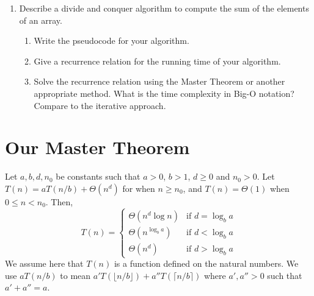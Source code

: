 \documentclass{article}
\begin{document}
\begin{enumerate}
    \item  Describe a divide and conquer algorithm to compute the sum of the elements of an array.
    \begin{enumerate}
        \item Write the pseudocode for your algorithm.
        \item Give a recurrence relation for the running time of your algorithm.
        \item Solve the recurrence relation using the Master Theorem or another appropriate method. What is the time complexity in Big-O notation?  Compare to the iterative approach.
    \end{enumerate}
\end{enumerate}

\section*{Our Master Theorem}

\begin{theorem}
Let $a, b, d, n_0$ be constants such that $a > 0$, $b > 1$, $d \ge 0$ and $n_0 > 0$. Let $T(n) = aT(n/b) + \Theta(n^d)$ for when $n \ge n_0$, and $T(n) = \Theta(1)$ when $0 \le n < n_0$. Then,
\[
T(n) = \begin{cases}
    \Theta(n^d \log n) & \text{if } d = \log_b a \\
    \Theta(n^{\log_b a}) & \text{if } d < \log_b a \\
    \Theta(n^d) & \text{if } d > \log_b a
\end{cases}
\]
We assume here that $T(n)$ is a function defined on the natural numbers. We use $aT(n/b)$ to mean $a'T(\lfloor n/b \rfloor) + a''T(\lceil n/b \rceil)$ where $a', a'' > 0$ such that $a' + a'' = a$.
\end{theorem}
\end{document}
